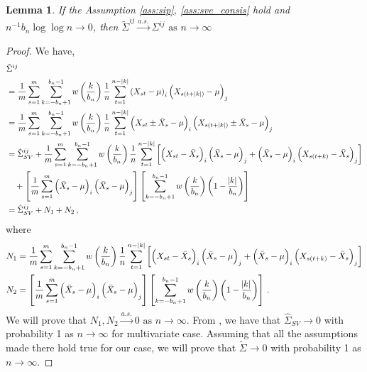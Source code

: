 \documentclass[12pt]{article}
\newtheorem{lemma}{Lemma}
\theoremstyle{remark}
\begin{document}
\begin{lemma} \label{lemma:pseudo_consis}
If the Assumption \ref{ass:sip}, \ref{ass:sve_consis} hold and $n^{-1}{b_n \log \log n}\to 0$, then $\tilde{\Sigma}^{ij} \xrightarrow{a.s.} \Sigma^{ij} \textrm{ as } n \to \infty$
\end{lemma}

\begin{proof}
We have,
\begin{align*}
    &\tilde{\Sigma}^{ij} \\
    & = \dfrac{1}{m}\sum_{s=1}^{m}\sum_{k=-b_n+1}^{b_n-1}w\left(\dfrac{k}{b_n}\right)\dfrac{1}{n}\sum_{t=1}^{n-|k|}  \left(X_{st} - \mu \right)_i  \left(X_{s(t+|k|)} - \mu \right)_j\\
    & = \dfrac{1}{m}\sum_{s=1}^{m}\sum_{k=-b_n+1}^{b_n-1}w\left(\dfrac{k}{b_n}\right)\dfrac{1}{n}\sum_{t=1}^{n-|k|}  \left(X_{st} \pm \bar{X}_s - \mu \right)_i  \left(X_{s(t+|k|)} \pm \bar{X}_s - \mu \right)_j\\
    & = \hat{\Sigma}_{SV}^{ij} + \dfrac{1}{m}\sum_{s=1}^{m}\sum_{k=-b_n+1}^{b_n-1}w\left(\dfrac{k}{b_n}\right)\dfrac{1}{n}\sum_{t=1}^{n-|k|}\left[ \left(X_{st} - \bar{X}_s \right)_i   \left(\bar{X}_s - \mu \right)_j + \left(\bar{X}_s - \mu \right)_i  \left(X_{s(t+k)} - \bar{X}_s \right)_j\right]\\
    & \quad + \left[\dfrac{1}{m}  \sum_{s=1}^{m}  \left(\bar{X}_s - \mu \right)_i  \left(\bar{X}_s - \mu \right)_j \right]  \left[\sum_{k=-b_n+1}^{b_n-1}w\left(\dfrac{k}{b_n}\right)\left(1 - \dfrac{\abs{k}}{b_n}\right) \right]\\
    & = \hat{\Sigma}_{SV}^{ij} + N_1 + N_2 \,,
\end{align*}
where
\begin{align*}
N_1 & = \dfrac{1}{m}\sum_{s=1}^{m}  \sum_{k=-b_n+1}^{b_n-1}  w\left(\dfrac{k}{b_n}\right)\dfrac{1}{n}  \sum_{t=1}^{n-|k|}  \left[ \left(X_{st} - \bar{X}_s \right)_i  \left(\bar{X}_s - \mu \right)_j + \left(\bar{X}_s - \mu \right)_i  \left(X_{s(t+k)} - \bar{X}_s \right)_j\right]\\
N_2 & = \left[\dfrac{1}{m}  \sum_{s=1}^{m}  \left(\bar{X}_s - \mu \right)_i  \left(\bar{X}_s - \mu \right)_j \right]  \left[\sum_{k=-b_n+1}^{b_n-1}w\left(\dfrac{k}{b_n}\right)\left(1 - \dfrac{\abs{k}}{b_n}\right) \right]\,.
\end{align*}
We will prove that $N_1, N_2\xrightarrow{a.s.} 0 \textrm{ as } n \to \infty$. From \cite{vats:fleg:jon:2018}, we have that $\hat{\Sigma}_{SV} \to 0$ with probability 1 as $n \to \infty$ for multivariate case. Assuming that all the assumptions made there hold true for our case, we will prove that $\tilde{\Sigma} \to 0$ with probability 1 as $n \to \infty$. 


\end{proof}
\end{document}
